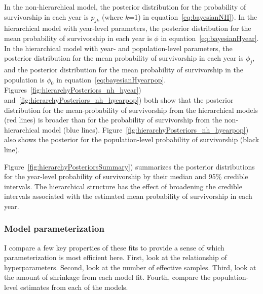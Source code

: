 \documentclass[12pt, oneside, titlepage]{article}   	%
\begin{document}
In the non-hierarchical model, the posterior distribution for the probability of survivorship in each year is $p_{jk}$ (where $k$=1) in equation~\eqref{eq:bayesianNH}). In the hierarchical model with year-level parameters, the posterior distribution for the mean probability of survivorship in each year is $\phi$ in equation~\eqref{eq:bayesianHyear}. In the hierarchical model with year- and population-level parameters, the posterior distribution for the mean probability of survivorship in each year is $\phi_j$, and the posterior distribution for the mean probability of survivorship in the population is $\phi_0$ in equation~\eqref{eq:bayesianHyearpop}. Figures~\ref{fig:hierarchyPosteriors_nh_hyear}) and~\ref{fig:hierarchyPosteriors_nh_hyearpop}) both show that the posterior distribution for the mean-probability of survivorship from the hierarchical models (red lines) is broader than for the probability of survivorship from the non-hierarchical model (blue lines). Figure~\ref{fig:hierarchyPosteriors_nh_hyearpop}) also shows the posterior for the population-level probability of survivorship (black line).

Figure~\ref{fig:hierarchyPosteriorsSummary}) summarizes the posterior distributions for the year-level probability of survivorship by their median and 95\% credible intervals. The hierarchical structure has the effect of broadening the credible intervals associated with the estimated mean probability of survivorship in each year. 
 
\subsubsection*{Model parameterization}
I compare a few key properties of these fits to provide a sense of which parameterization is most efficient here. First, look at the relationship of hyperparameters. Second, look at the number of effective samples. Third, look at the amount of shrinkage from each model fit. Fourth, compare the population-level estimates from each of the models. 
\end{document}
